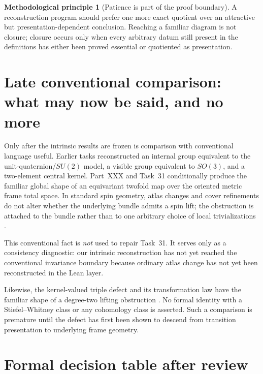 \documentclass[11pt,a4paper]{article}
\theoremstyle{definition}
\newtheorem{principle}{Methodological principle}
\begin{document}
\begin{principle}[Patience is part of the proof boundary]
A reconstruction program should prefer one more exact quotient over an attractive but presentation-dependent conclusion.  Reaching a familiar diagram is not closure; closure occurs only when every arbitrary datum still present in the definitions has either been proved essential or quotiented as presentation.
\end{principle}

\section{Late conventional comparison: what may now be said, and no more}\label{sec:comparison}

Only after the intrinsic results are frozen is comparison with conventional language useful.  Earlier tasks reconstructed an internal group equivalent to the unit-quaternion/$SU(2)$ model, a visible group equivalent to $SO(3)$, and a two-element central kernel.  Part~XXX and Task~31 conditionally produce the familiar global shape of an equivariant twofold map over the oriented metric frame total space.  In standard spin geometry, atlas changes and cover refinements do not alter whether the underlying bundle admits a spin lift; the obstruction is attached to the bundle rather than to one arbitrary choice of local trivializations \cite{LawsonMichelsohn1989,Husemoller1994,Steenrod1951}.

This conventional fact is \emph{not} used to repair Task~31.  It serves only as a consistency diagnostic: our intrinsic reconstruction has not yet reached the conventional invariance boundary because ordinary atlas change has not yet been reconstructed in the Lean layer.

Likewise, the kernel-valued triple defect and its transformation law have the familiar shape of a degree-two lifting obstruction \cite{MilnorStasheff1974,LawsonMichelsohn1989}.  No formal identity with a Stiefel--Whitney class or any cohomology class is asserted.  Such a comparison is premature until the defect has first been shown to descend from transition presentation to underlying frame geometry.

\section{Formal decision table after review}\label{sec:decision}
\end{document}
